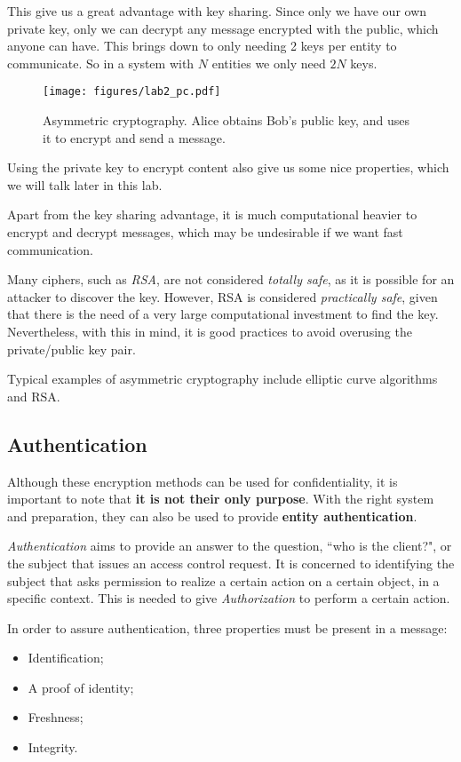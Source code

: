 \documentclass[12pt,a4paper]{article}
\theoremstyle{definition}
\begin{document}
This give us a great advantage with key sharing. Since only we have our own private key, only we can decrypt any message encrypted with the public, which anyone can have. This brings down to only needing 2 keys per entity to communicate. So in a system with $N$ entities we only need $2N$ keys.

\begin{figure}[h]
    \centering
    \texttt{[image: figures/lab2\_pc.pdf]}
    \caption{Asymmetric cryptography. Alice obtains Bob's public key, and uses it to encrypt and send a message.}
    \label{fig:pc}
\end{figure}

Using the private key to encrypt content also give us some nice properties, which we will talk later in this lab.

Apart from the key sharing advantage, it is much computational heavier to encrypt and decrypt messages, which may be undesirable if we want fast communication.

Many ciphers, such as \emph{RSA}, are not considered \emph{totally safe}, as it is possible for an attacker to discover the key. However, RSA is considered \emph{practically safe}, given that there is the need of a very large computational investment to find the key. 
Nevertheless, with this in mind, it is good practices to avoid overusing the private/public key pair.

Typical examples of asymmetric cryptography include elliptic curve algorithms and RSA.

\subsection{Authentication}

Although these encryption methods can be used for confidentiality, it is important to note that \textbf{it is not their only purpose}. With the right system and preparation, they can also be used to provide \textbf{entity authentication}.

\emph{Authentication} aims to provide an answer to the question, ``who is the client?", or the subject that issues an access control request. It is concerned to identifying the subject that asks permission to realize a certain action on a certain object, in a specific context.
This is needed to give \emph{Authorization} to perform a certain action.

In order to assure authentication, three properties must be present in a message:
\begin{itemize}
    \item Identification;
    \item A proof of identity;
    \item Freshness;
    \item Integrity.
\end{itemize}
\end{document}
